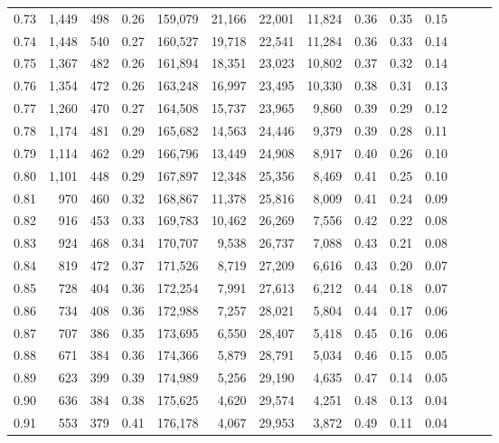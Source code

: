 \begin{tabular}{rrrrrrrrrrrrrr}
0.73 &  1,449 &    498 &  0.26 &  159,079 &   21,166 &  22,001 &  11,824 &  0.36 &  0.35 &      0.15 \\
0.74 &  1,448 &    540 &  0.27 &  160,527 &   19,718 &  22,541 &  11,284 &  0.36 &  0.33 &      0.14 \\
0.75 &  1,367 &    482 &  0.26 &  161,894 &   18,351 &  23,023 &  10,802 &  0.37 &  0.32 &      0.14 \\
0.76 &  1,354 &    472 &  0.26 &  163,248 &   16,997 &  23,495 &  10,330 &  0.38 &  0.31 &      0.13 \\
0.77 &  1,260 &    470 &  0.27 &  164,508 &   15,737 &  23,965 &   9,860 &  0.39 &  0.29 &      0.12 \\
0.78 &  1,174 &    481 &  0.29 &  165,682 &   14,563 &  24,446 &   9,379 &  0.39 &  0.28 &      0.11 \\
0.79 &  1,114 &    462 &  0.29 &  166,796 &   13,449 &  24,908 &   8,917 &  0.40 &  0.26 &      0.10 \\
0.80 &  1,101 &    448 &  0.29 &  167,897 &   12,348 &  25,356 &   8,469 &  0.41 &  0.25 &      0.10 \\
0.81 &    970 &    460 &  0.32 &  168,867 &   11,378 &  25,816 &   8,009 &  0.41 &  0.24 &      0.09 \\
0.82 &    916 &    453 &  0.33 &  169,783 &   10,462 &  26,269 &   7,556 &  0.42 &  0.22 &      0.08 \\
0.83 &    924 &    468 &  0.34 &  170,707 &    9,538 &  26,737 &   7,088 &  0.43 &  0.21 &      0.08 \\
0.84 &    819 &    472 &  0.37 &  171,526 &    8,719 &  27,209 &   6,616 &  0.43 &  0.20 &      0.07 \\
0.85 &    728 &    404 &  0.36 &  172,254 &    7,991 &  27,613 &   6,212 &  0.44 &  0.18 &      0.07 \\
0.86 &    734 &    408 &  0.36 &  172,988 &    7,257 &  28,021 &   5,804 &  0.44 &  0.17 &      0.06 \\
0.87 &    707 &    386 &  0.35 &  173,695 &    6,550 &  28,407 &   5,418 &  0.45 &  0.16 &      0.06 \\
0.88 &    671 &    384 &  0.36 &  174,366 &    5,879 &  28,791 &   5,034 &  0.46 &  0.15 &      0.05 \\
0.89 &    623 &    399 &  0.39 &  174,989 &    5,256 &  29,190 &   4,635 &  0.47 &  0.14 &      0.05 \\
0.90 &    636 &    384 &  0.38 &  175,625 &    4,620 &  29,574 &   4,251 &  0.48 &  0.13 &      0.04 \\
0.91 &    553 &    379 &  0.41 &  176,178 &    4,067 &  29,953 &   3,872 &  0.49 &  0.11 &      0.04 \\

\end{tabular}
